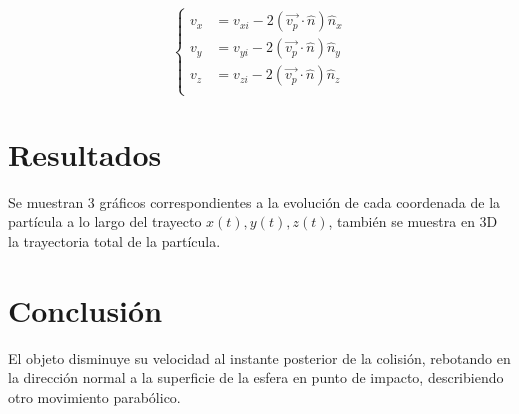 \documentclass[a4paper,10pt]{article}
\begin{document}
	\[
	\begin{cases}
		v_x &= v_{xi} - 2\left( \overrightarrow{v_p} \cdot \hat{n} \right) \hat{n}_x\\
		v_y &= v_{yi} - 2\left( \overrightarrow{v_p} \cdot \hat{n} \right) \hat{n}_y\\
		v_z &= v_{zi} - 2\left( \overrightarrow{v_p} \cdot \hat{n} \right) \hat{n}_z\\
	\end{cases}
	\]
		
	\section{Resultados}
	Se muestran 3 gráficos correspondientes a la evolución de cada coordenada de la partícula a lo largo del trayecto \(x(t), y(t),z(t)\), también se muestra en 3D la trayectoria total de la partícula.
	
	\section{Conclusión}
	El objeto disminuye su velocidad al instante posterior de la colisión, rebotando en la dirección normal a la superficie de la esfera en punto de impacto, describiendo otro movimiento parabólico.
	
\end{document}
